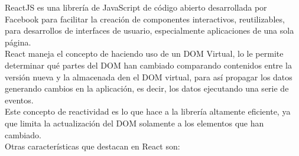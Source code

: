         ReactJS es una librería de JavaScript de código abierto desarrollada por Facebook para facilitar la creación de componentes interactivos, reutilizables, para desarrollos de interfaces de usuario, especialmente aplicaciones de una sola página.\\

        React maneja el concepto de  haciendo uso de un DOM Virtual, lo le permite determinar qué partes del DOM han cambiado comparando contenidos entre la versión nueva y la almacenada den el DOM virtual, para así propagar los datos generando cambios en la aplicación, es decir, los datos  ejecutando una serie de eventos.\\

        Este concepto de reactividad es lo que hace a la librería altamente eficiente, ya que limita la actualización del DOM solamente a los elementos que han cambiado.\\

        Otras características que destacan en React son:\\

